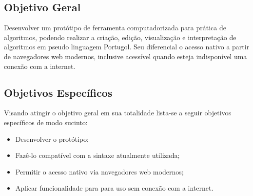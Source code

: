 \subsection{Objetivo Geral}

Desenvolver um protótipo de ferramenta computadorizada para prática de algoritmos, podendo realizar a criação, edição, visualização e interpretação de algoritmos em pseudo linguagem Portugol. Seu diferencial o acesso nativo a partir de navegadores web modernos, inclusive acessível quando esteja indisponível uma conexão com a internet.

\subsection{Objetivos Específicos}

Visando atingir o objetivo geral em sua totalidade lista-se a seguir objetivos
específicos de modo sucinto:

\begin{itemize}
\setlength\itemsep{0em}

\item Desenvolver o protótipo;

\item Fazê-lo compatível com a sintaxe atualmente utilizada;

\item Permitir o acesso nativo via navegadores web modernos;


\item Aplicar funcionalidade para para uso sem conexão com a internet.

\end{itemize}
